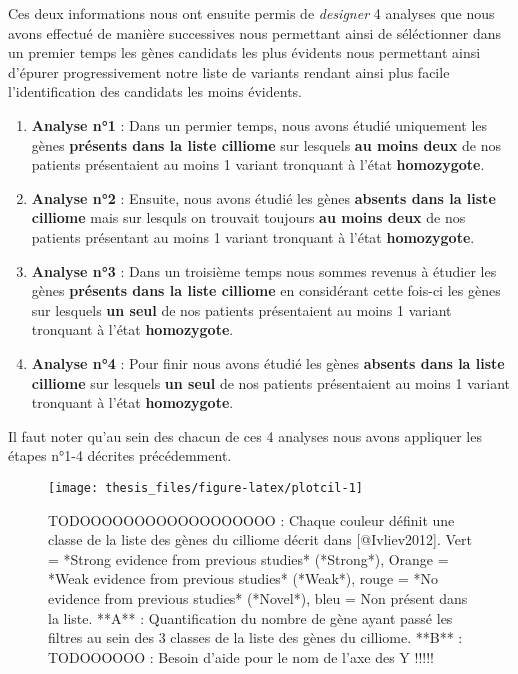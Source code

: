 \documentclass[12pt,twoside]{reedthesis}
\theoremstyle{definition}
\theoremstyle{definition}
\theoremstyle{remark}
\begin{document}
  Ces deux informations nous ont ensuite permis de \emph{designer} 4
  analyses que nous avons effectué de manière successives nous permettant
  ainsi de séléctionner dans un premier temps les gènes candidats les plus
  évidents nous permettant ainsi d'épurer progressivement notre liste de
  variants rendant ainsi plus facile l'identification des candidats les
  moins évidents.
  
  \begin{enumerate}
  \def\labelenumi{\arabic{enumi}.}
  \item
    \textbf{Analyse n°1} : Dans un permier temps, nous avons étudié
    uniquement les gènes \textbf{présents dans la liste cilliome} sur
    lesquels \textbf{au moins deux} de nos patients présentaient au moins
    1 variant tronquant à l'état \textbf{homozygote}.
  \item
    \textbf{Analyse n°2} : Ensuite, nous avons étudié les gènes
    \textbf{absents dans la liste cilliome} mais sur lesquls on trouvait
    toujours \textbf{au moins deux} de nos patients présentant au moins 1
    variant tronquant à l'état \textbf{homozygote}.
  \item
    \textbf{Analyse n°3} : Dans un troisième temps nous sommes revenus à
    étudier les gènes \textbf{présents dans la liste cilliome} en
    considérant cette fois-ci les gènes sur lesquels \textbf{un seul} de
    nos patients présentaient au moins 1 variant tronquant à l'état
    \textbf{homozygote}.
  \item
    \textbf{Analyse n°4} : Pour finir nous avons étudié les gènes
    \textbf{absents dans la liste cilliome} sur lesquels \textbf{un seul}
    de nos patients présentaient au moins 1 variant tronquant à l'état
    \textbf{homozygote}.
  \end{enumerate}
  
  Il faut noter qu'au sein des chacun de ces 4 analyses nous avons
  appliquer les étapes n°1-4 décrites précédemment.
  
  \newpage
  
  \begin{figure}
  
  {\centering \texttt{[image: thesis\_files/figure-latex/plotcil-1]} 
  
  }
  
  \caption[TODOOOOOOOOOOOOOOOOOO]{TODOOOOOOOOOOOOOOOOOO : Chaque couleur définit une classe de la liste des gènes du cilliome décrit dans [@Ivliev2012]. Vert = *Strong evidence from previous studies* (*Strong*), Orange = *Weak evidence from previous studies* (*Weak*), rouge = *No evidence from previous studies* (*Novel*), bleu = Non présent dans la liste. **A** : Quantification du nombre de gène ayant passé les filtres au sein des 3 classes de la liste des gènes du cilliome. **B** : TODOOOOOO : Besoin d'aide pour le nom de l'axe des Y !!!!!}\label{fig:plotcil}
  \end{figure}
  
\end{document}

